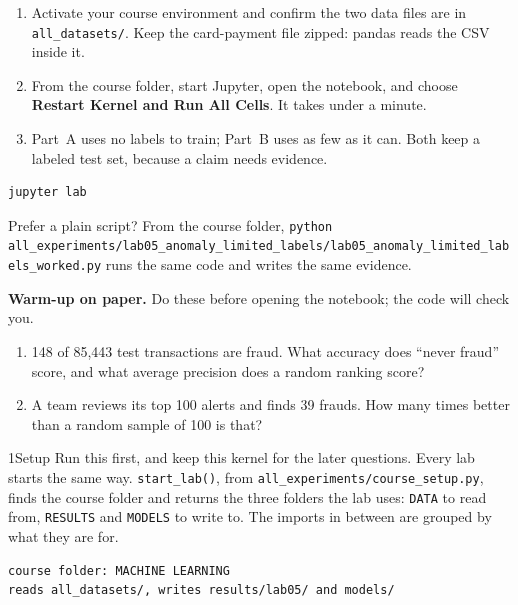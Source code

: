 \begin{labmode}
\begin{enumerate}
  \item Activate your course environment and confirm the two data files are in \texttt{all\_datasets/}. Keep the card-payment file zipped: pandas reads the CSV inside it.
  \item From the course folder, start Jupyter, open the notebook, and choose \textbf{Restart Kernel and Run All Cells}. It takes under a minute.
  \item Part~A uses no labels to train; Part~B uses as few as it can. Both keep a labeled test set, because a claim needs evidence.
\end{enumerate}
\begin{lstlisting}[style=utpterminal]
jupyter lab
\end{lstlisting}
Prefer a plain script? From the course folder, \texttt{python all\_experiments/\allowbreak lab05\_anomaly\_limited\_labels/\allowbreak lab05\_anomaly\_limited\_labels\_worked.py} runs the same code and writes the same evidence.
\end{labmode}

\labroutine

\begin{yourturn}
\textbf{Warm-up on paper.} Do these before opening the notebook; the code will check you.
\begin{enumerate}
  \item 148 of 85,443 test transactions are fraud. What accuracy does ``never fraud'' score, and what average precision does a random ranking score?
  \item A team reviews its top 100 alerts and finds 39 frauds. How many times better than a random sample of 100 is that?
\end{enumerate}
\end{yourturn}

\begin{labquestion}{1}{Setup}
Run this first, and keep this kernel for the later questions. Every lab starts the same way. \texttt{start\_lab()}, from \texttt{all\_experiments/\allowbreak course\_setup.py}, finds the course folder and returns the three folders the lab uses: \texttt{DATA} to read from, \texttt{RESULTS} and \texttt{MODELS} to write to. The imports in between are grouped by what they are for.
\end{labquestion}
\begin{labanswer}

\begin{refoutput}
\begin{lstlisting}[style=utpterminal]
course folder: MACHINE LEARNING
reads all_datasets/, writes results/lab05/ and models/
\end{lstlisting}
\end{refoutput}
\end{labanswer}

